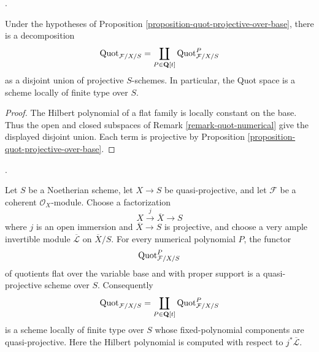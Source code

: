\begin{lemma}
\label{corollary-quot-projective-components}
\begin{reference}
\cite[Expos\'e 221, Theorem 3.1, pp. 259--260]{FGA}.
\end{reference}
Under the hypotheses of Proposition
\ref{proposition-quot-projective-over-base}, there is a decomposition
$$
\mathrm{Quot}_{\mathcal{F}/X/S} =
\coprod_{P \in \mathbf{Q}[t]}
\mathrm{Quot}^P_{\mathcal{F}/X/S}
$$
as a disjoint union of projective $S$-schemes. In particular, the Quot
space is a scheme locally of finite type over $S$.
\end{lemma}

\begin{proof}
The Hilbert polynomial of a flat family is locally constant on the
base. Thus the open and closed subspaces of
Remark \ref{remark-quot-numerical} give the displayed disjoint union.
Each term is projective by Proposition
\ref{proposition-quot-projective-over-base}.
\end{proof}

\begin{proposition}
\label{proposition-quot-quasi-projective-over-base}
\begin{reference}
\cite[Expos\'e 221, Section 4(a), pp. 266--267]{FGA}.
\end{reference}
Let $S$ be a Noetherian scheme, let $X \to S$ be quasi-projective,
and let $\mathcal{F}$ be a coherent $\mathcal{O}_X$-module. Choose a
factorization
$$
X \xrightarrow{j} \overline{X} \longrightarrow S
$$
where $j$ is an open immersion and $\overline{X} \to S$ is projective,
and choose a very ample invertible module $\overline{\mathcal{L}}$ on
$\overline{X}/S$. For every numerical polynomial $P$, the functor
$$
\mathrm{Quot}^P_{\mathcal{F}/X/S}
$$
of quotients flat over the variable base and with proper support is a
quasi-projective scheme over $S$. Consequently
$$
\mathrm{Quot}_{\mathcal{F}/X/S} =
\coprod_{P \in \mathbf{Q}[t]}
\mathrm{Quot}^P_{\mathcal{F}/X/S}
$$
is a scheme locally of finite type over $S$ whose fixed-polynomial
components are quasi-projective. Here the Hilbert polynomial is computed
with respect to $j^*\overline{\mathcal{L}}$.
\end{proposition}

